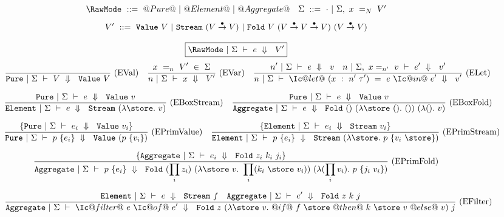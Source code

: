 
\begin{figure*}
$$
\begin{array}{ll}

\RawMode~::=~@Pure@~|~@Element@~|~@Aggregate@

&

\Sigma~::=~\cdot~|~\Sigma,~x~=_N~V'

\end{array}
$$
$$
V'~     ::=~\VValue{V}
        ~|~\VStream {(V \stackrel{\bullet}{\to} V)}
        ~|~\VFold{V}{(V \stackrel{\bullet}{\to} V \stackrel{\bullet}{\to} V)}
                    {(V \stackrel{\bullet}{\to} V)}
$$

  \footnotesize


$$
\boxed{\SourceStepX{\RawMode}{\Sigma}{e}{V'}}
$$
$$
\ruleAx
{
    \SourceStepXP{\Sigma}{V}{\VValue{V}}
}{EVal}
\ruleIN
{
    x~=_n~V'~\in~\Sigma
}
{
    \SourceStepX{n}{\Sigma}{x}{V'}
}{EVar}
\ruleIN
{
  \SourceStepX{n'}{\Sigma}{e}{v}
  \quad
  \SourceStepX{n}{\Sigma,~x =_{n'}~ v}{e'}{v'}
}
{
  \SourceStepX
    {n}
    {\Sigma}
    {\Ic@let@~(x~:~n'~\tau')~=~e~\Ic@in@~e'}
    {v'}
}{ELet}
$$

$$
\ruleIN
{
    \SourceStepXP{\Sigma}{e}{\VValue{v}}
}
{
    \SourceStepXE{\Sigma}{e}{\VStream{(\lam{\store} v)}}
}{EBoxStream}
\ruleIN
{
    \SourceStepXP{\Sigma}{e}{\VValue{v}}
}
{
    \SourceStepXA{\Sigma}{e}{\VFold{()}{(\lam{\store~()} ())}{(\lam{()} v)}}
}{EBoxFold}
$$

$$
\ruleIN
{
  \{ \SourceStepXP{\Sigma}{e_i}{\VValue{v_i}} \}
}
{
  \SourceStepXP
    {\Sigma}
    {p~\{ e_i \} }
    {\VValue{(p~\{v_i\})}}
}{EPrimValue}
\ruleIN
{
  \{ \SourceStepXE{\Sigma}{e_i}{\VStream{v_i}} \}
}
{
  \SourceStepXE
    {\Sigma}
    {p~\{ e_i \} }
    {\VStream{(\lam{\store} p~\{v_i~\store\})}}
}{EPrimStream}
$$

$$
\ruleIN
{
  \{ \SourceStepXA{\Sigma}{e_i}{\VFold{z_i}{k_i}{j_i}} \}
}
{
  \SourceStepXA{\Sigma}
    {p~\{ e_i \} }
    { \VFold
      {(\prod_i z_i)}
      {(\lam{\store~v}
        \prod_i (k_i~\store~v_i))}
      {(\lam{(\prod_i v_i)}
        p~\{j_i~v_i\})}}
}{EPrimFold}
$$

$$
\ruleIN
{
  \SourceStepXE{\Sigma}{e}{\VStream{f}}
  \quad
  \SourceStepXA{\Sigma}{e'}{\VFold{z}{k}{j}}
}
{
  \SourceStepXA{\Sigma}
    {\Ic@filter@~e~\Ic@of@~e'}
    {\VFold
      {z}
      {(\lam{\store~v}
         @if@~f~\store~@then@~k~\store~v~@else@~v)}
      {j}}
}{EFilter}
$$


\end{figure*}
